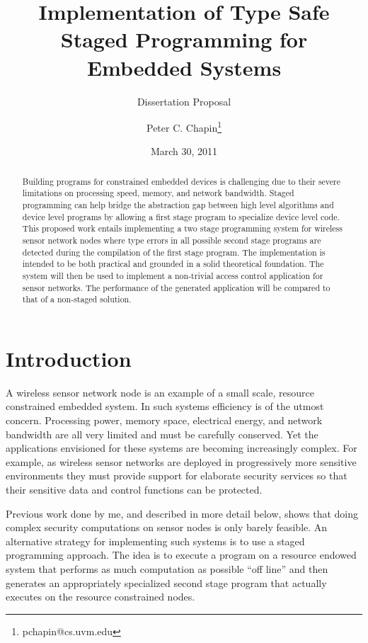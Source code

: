 \documentclass{article}
\begin{document}


\title{Implementation of Type Safe Staged Programming for Embedded Systems}
\subtitle{Dissertation Proposal}
\author{Peter C. Chapin\thanks{pchapin@cs.uvm.edu}}
\date{March 30, 2011}
\maketitle

\begin{abstract}
  Building programs for constrained embedded devices is challenging due to their severe
  limitations on processing speed, memory, and network bandwidth. Staged programming can help
  bridge the abstraction gap between high level algorithms and device level programs by allowing
  a first stage program to specialize device level code. This proposed work entails implementing
  a two stage programming system for wireless sensor network nodes where type errors in all
  possible second stage programs are detected during the compilation of the first stage program.
  The implementation is intended to be both practical and grounded in a solid theoretical
  foundation. The system will then be used to implement a non-trivial access control application
  for sensor networks. The performance of the generated application will be compared to that of
  a non-staged solution.
\end{abstract}

\section{Introduction}
\label{sec:introduction}

A wireless sensor network node is an example of a small scale, resource constrained embedded
system. In such systems efficiency is of the utmost concern. Processing power, memory space,
electrical energy, and network bandwidth are all very limited and must be carefully conserved.
Yet the applications envisioned for these systems are becoming increasingly complex. For
example, as wireless sensor networks are deployed in progressively more sensitive environments
they must provide support for elaborate security services so that their sensitive data and
control functions can be protected.

Previous work done by me, and described in more detail below, shows that doing complex security
computations on sensor nodes is only barely feasible. An alternative strategy for implementing
such systems is to use a staged programming approach. The idea is to execute a program on a
resource endowed system that performs as much computation as possible ``off line'' and then
generates an appropriately specialized second stage program that actually executes on the
resource constrained nodes.
\end{document}
